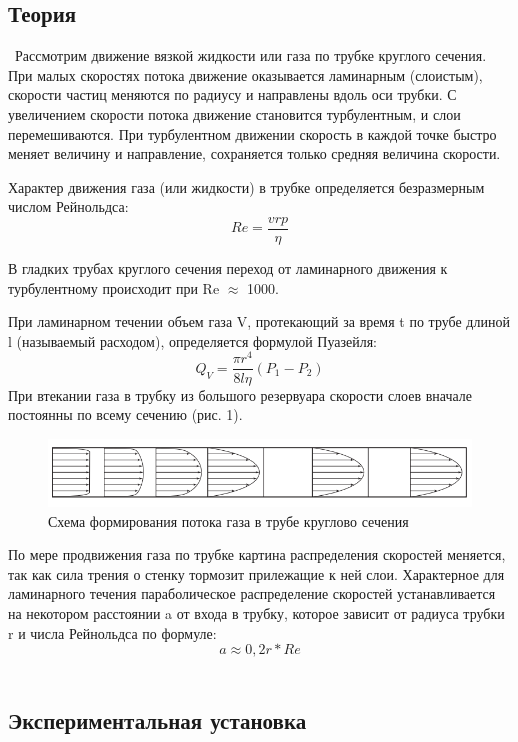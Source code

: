 \documentclass[a4paper,12pt]{article}
\theoremstyle{plain} %
\theoremstyle{definition} %
\theoremstyle{remark} %
\begin{document}
\subsection{Теория}\
\indent Рассмотрим движение вязкой жидкости или газа по трубке круглого сечения. При малых скоростях потока движение оказывается ламинарным (слоистым), скорости частиц меняются по радиусу и направлены вдоль оси трубки. С увеличением скорости потока движение
становится турбулентным, и слои перемешиваются. При турбулентном движении скорость в каждой точке быстро меняет величину и направление, сохраняется только средняя величина скорости.

Характер движения газа (или жидкости) в трубке определяется безразмерным числом Рейнольдса: $$Re=\frac{vrp}{\eta}$$

В гладких трубах круглого сечения переход от ламинарного движения к турбулентному происходит при Re $\approx$ 1000.

При ламинарном течении объем газа V, протекающий за время t по трубе длиной l (называемый расходом), определяется формулой Пуазейля: $$Q_V=\frac{\pi r^4}{8l\eta}(P_1-P_2)$$
При	втекании	газа	в	
трубку	из большого резервуара скорости слоев вначале постоянны по всему сечению (рис. 1). 


\begin{figure}\label{pic:sheme}
	\includegraphics[width=\linewidth]{pic1.png}
	\caption{Схема формирования потока газа в трубе круглово сечения}
\end{figure}

\indent По мере продвижения  газа по	трубке	
картина распределения скоростей меняется, так как сила трения о стенку тормозит прилежащие к ней слои. Характерное для ламинарного	
течения параболическое распределение скоростей устанавливается на	
некотором расстоянии a от входа в трубку, которое зависит от радиуса трубки r и числа Рейнольдса по формуле: $$a\approx0,2r*Re$$\\

\subsection{Экспериментальная установка}
\end{document}
